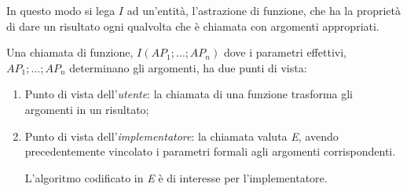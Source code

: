 \documentclass[12pt]{report}
\begin{document}
 	In questo modo si lega $I$ ad un'entità, l'astrazione di funzione, che ha la proprietà di dare un risultato ogni qualvolta che è chiamata con argomenti appropriati.

 	Una chiamata di funzione, $I(AP_1; \dots; AP_n)$ dove i parametri effettivi, $AP_1; \dots; AP_n$ determinano gli argomenti, ha due punti di vista:
 	\begin{enumerate}
 		\item Punto di vista dell'\textit{utente}: la chiamata di una funzione trasforma gli argomenti in un risultato;
 		\item Punto di vista dell'\textit{implementatore}: la chiamata valuta \textit{E}, avendo precedentemente vincolato i parametri formali agli argomenti corrispondenti.

 		L'algoritmo codificato in \textit{E} è di interesse per l'implementatore.
 	\end{enumerate}
\end{document}
